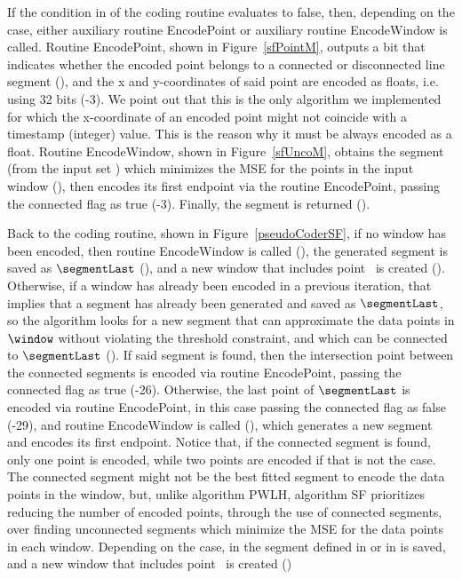 If the condition in  of the coding routine evaluates to false, then, depending on the case, either auxiliary routine EncodePoint or auxiliary routine EncodeWindow is called. Routine EncodePoint, shown in Figure~\ref{sfPointM}, outputs a bit that indicates whether the encoded point belongs to a connected or disconnected line segment (), and the x and y-coordinates of said point are encoded as floats, i.e. using 32 bits (-3). We point out that this is the only algorithm we implemented for which the x-coordinate of an encoded point might not coincide with a timestamp (integer) value. This is the reason why it must be always encoded as a float. Routine EncodeWindow, shown in Figure~\ref{sfUncoM}, obtains the segment (from the input set \segmentSet) which minimizes the MSE for the points in the input window (), then encodes its first endpoint via the routine EncodePoint, passing the connected flag as true (-3). Finally, the segment is returned ().


Back to the coding routine, shown in Figure~\ref{pseudoCoderSF}, if no window has been encoded, then routine EncodeWindow is called (), the generated segment is saved as $\segmentLast$ (), and a new window that includes point \point\ is created (). Otherwise, if a window has already been encoded in a previous iteration, that implies that a segment has already been generated and saved as $\segmentLast$, so the algorithm looks for a new segment that can approximate the data points in $\window$ without violating the threshold constraint, and which can be connected to $\segmentLast$ (). If said segment is found, then the intersection point between the connected segments is encoded via routine EncodePoint, passing the connected flag as true (-26). Otherwise, the last point of $\segmentLast$ is encoded via routine EncodePoint, in this case passing the connected flag as false (-29), and routine EncodeWindow is called (), which generates a new segment and encodes its first endpoint. Notice that, if the connected segment is found, only one point is encoded, while two points are encoded if that is not the case. The connected segment might not be the best fitted segment to encode the data points in the window, but, unlike algorithm PWLH, algorithm SF prioritizes reducing the number of encoded points, through the use of connected segments, over finding unconnected segments which minimize the MSE for the data points in each window. Depending on the case, in  the segment defined in  or in  is saved, and a new window that includes point \point\ is created ()


